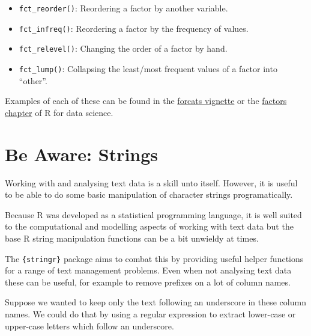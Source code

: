 \documentclass[
  12pt,
]{book}
\providecommand{\tightlist}{%
  \setlength{\itemsep}{0pt}\setlength{\parskip}{0pt}}
\begin{document}
\begin{itemize}
\tightlist
\item
  \texttt{fct\_reorder()}: Reordering a factor by another variable.
\item
  \texttt{fct\_infreq()}: Reordering a factor by the frequency of values.
\item
  \texttt{fct\_relevel()}: Changing the order of a factor by hand.
\item
  \texttt{fct\_lump()}: Collapsing the least/most frequent values of a factor into ``other''.
\end{itemize}

Examples of each of these can be found in the \href{https://forcats.tidyverse.org/articles/forcats.html}{forcats vignette} or the \href{(https://r4ds.had.co.nz/factors.html)}{factors chapter} of R for data science.

\hypertarget{be-aware-strings}{%
\section{Be Aware: Strings}\label{be-aware-strings}}

Working with and analysing text data is a skill unto itself. However, it is useful to be able to do some basic manipulation of character strings programatically.

Because R was developed as a statistical programming language, it is well suited to the computational and modelling aspects of working with text data but the base R string manipulation functions can be a bit unwieldy at times.

The \texttt{\{stringr\}} package aims to combat this by providing useful helper functions for a range of text management problems. Even when not analysing text data these can be useful, for example to remove prefixes on a lot of column names.

Suppose we wanted to keep only the text following an underscore in these column names. We could do that by using a regular expression to extract lower-case or upper-case letters which follow an underscore.
\end{document}
